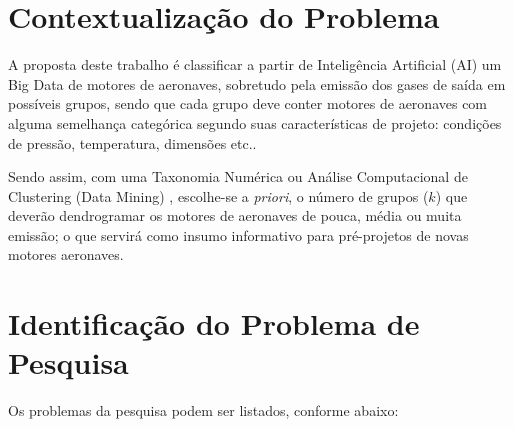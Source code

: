\documentclass[12pt]{article} %
\begin{document}
	
	\section{Contextualização do Problema}
	
		A proposta deste trabalho é classificar a partir de Inteligência Artificial (AI) um Big Data de motores de aeronaves, sobretudo pela emissão dos gases de saída em possíveis grupos, sendo que cada grupo deve conter motores de aeronaves com alguma semelhança categórica segundo suas características de projeto: condições de pressão, temperatura, dimensões etc..
		
		Sendo assim, com uma Taxonomia Numérica \cite{Manktelow2010} ou Análise Computacional de Clustering (Data Mining) \cite{Anderberg1973}, escolhe-se a \textit{priori}, o número de grupos ($ k $) que deverão dendrogramar os motores de aeronaves de pouca, média ou muita emissão; o que servirá como insumo informativo para pré-projetos de novas motores aeronaves.
	
	\section{Identificação do Problema de Pesquisa}	
	
		Os problemas da pesquisa podem ser listados, conforme abaixo:
		
\end{document}
